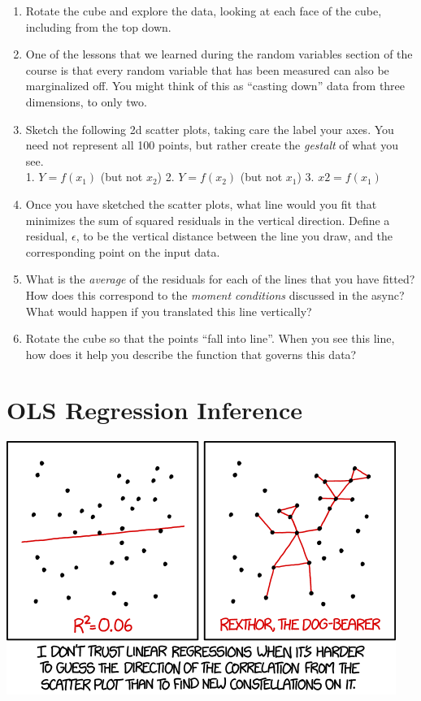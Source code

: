 \documentclass[
]{book}
\providecommand{\tightlist}{%
  \setlength{\itemsep}{0pt}\setlength{\parskip}{0pt}}
\theoremstyle{definition}
\theoremstyle{definition}
\theoremstyle{definition}
\theoremstyle{definition}
\theoremstyle{remark}
\begin{document}
\begin{enumerate}
\def\labelenumi{\arabic{enumi}.}
\tightlist
\item
  Rotate the cube and explore the data, looking at each face of the cube, including from the top down.
\item
  One of the lessons that we learned during the random variables section of the course is that every random variable that has been measured can also be marginalized off. You might think of this as ``casting down'' data from three dimensions, to only two.
\item
  Sketch the following 2d scatter plots, taking care the label your axes. You need not represent all 100 points, but rather create the \emph{gestalt} of what you see.\\
  1. \(Y = f(x_1)\) (but not \(x_2\))
  2. \(Y = f(x_2)\) (but not \(x_1\))
  3. \(x2 = f(x_1)\)
\item
  Once you have sketched the scatter plots, what line would you fit that minimizes the sum of squared residuals in the vertical direction. Define a residual, \(\epsilon\), to be the vertical distance between the line you draw, and the corresponding point on the input data.
\item
  What is the \emph{average} of the residuals for each of the lines that you have fitted? How does this correspond to the \emph{moment conditions} discussed in the async? What would happen if you translated this line vertically?
\item
  Rotate the cube so that the points ``fall into line''. When you see this line, how does it help you describe the function that governs this data?
\end{enumerate}

\hypertarget{ols-regression-inference}{%
\chapter{OLS Regression Inference}\label{ols-regression-inference}}

\includegraphics{images/linear_regression.png}
\end{document}
